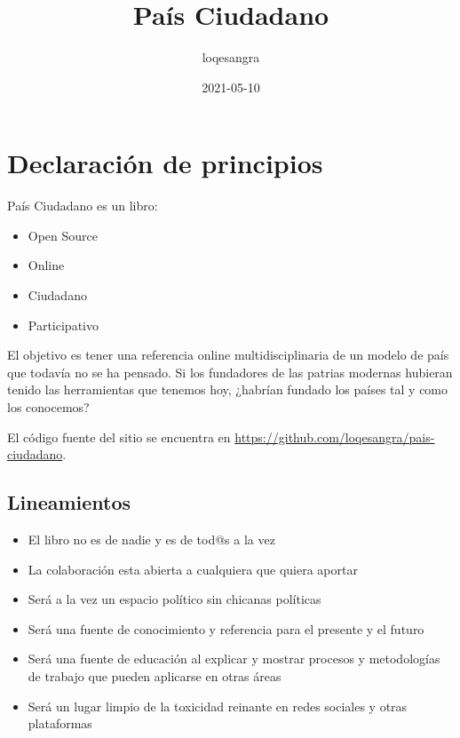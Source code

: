 \documentclass[
]{book}
\title{País Ciudadano}
\author{loqesangra}
\date{2021-05-10}
\providecommand{\tightlist}{%
  \setlength{\itemsep}{0pt}\setlength{\parskip}{0pt}}
\begin{document}
\maketitle

{
\setcounter{tocdepth}{1}
\tableofcontents
}
\hypertarget{declaraciuxf3n-de-principios}{%
\chapter{Declaración de principios}\label{declaraciuxf3n-de-principios}}

País Ciudadano es un libro:

\begin{itemize}
\tightlist
\item
  Open Source
\item
  Online
\item
  Ciudadano
\item
  Participativo
\end{itemize}

El objetivo es tener una referencia online multidisciplinaria de un modelo de país que todavía no se ha pensado. Si los fundadores de las patrias modernas hubieran tenido las herramientas que tenemos hoy, ¿habrían fundado los países tal y como los conocemos?

El código fuente del sitio se encuentra en \url{https://github.com/loqesangra/pais-ciudadano}.

\hypertarget{lineamientos}{%
\section{Lineamientos}\label{lineamientos}}

\begin{itemize}
\tightlist
\item
  El libro no es de nadie y es de tod@s a la vez
\item
  La colaboración esta abierta a cualquiera que quiera aportar
\item
  Será a la vez un espacio político sin chicanas políticas
\item
  Será una fuente de conocimiento y referencia para el presente y el futuro
\item
  Será una fuente de educación al explicar y mostrar procesos y metodologías de trabajo que pueden aplicarse en otras áreas
\item
  Será un lugar limpio de la toxicidad reinante en redes sociales y otras plataformas
\end{itemize}
\end{document}
